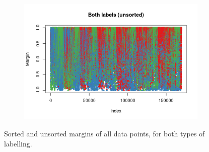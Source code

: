 \documentclass{l4proj}
\theoremstyle{definition}
\theoremstyle{remark}
\begin{document}
\begin{figure}
\begin{subfigure}[t]{0.49\textwidth}
    \includegraphics[width=\textwidth]{images/both_labels_margin2.png}
  \end{subfigure}
  \caption{Sorted and unsorted margins of all data points, for both types of
    labelling.}
  \label{fig:margins}
\end{figure}
\end{document}
